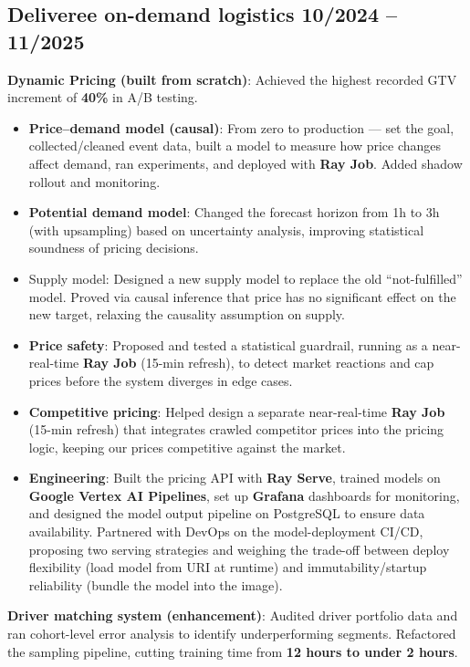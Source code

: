 \subsection{Deliveree on-demand logistics \hfill 10/2024 -- 11/2025}
\begin{zitemize}
    \item \textbf{Dynamic Pricing (built from scratch)}: Achieved the highest recorded GTV increment of \textbf{40\%} in A/B testing.
    \begin{itemize}
        \item \textbf{Price--demand model (causal)}: From zero to production --- set the goal, collected/cleaned event data, built a model to measure how price changes affect demand, ran experiments, and deployed with \textbf{Ray Job}. Added shadow rollout and monitoring.
        \item \textbf{Potential demand model}: Changed the forecast horizon from 1h to 3h (with upsampling) based on uncertainty analysis, improving statistical soundness of pricing decisions.
        \item Supply model: Designed a new supply model to replace the old ``not-fulfilled'' model. Proved via causal inference that price has no significant effect on the new target, relaxing the causality assumption on supply.
        \item \textbf{Price safety}: Proposed and tested a statistical guardrail, running as a near-real-time \textbf{Ray Job} (15-min refresh), to detect market reactions and cap prices before the system diverges in edge cases.
        \item \textbf{Competitive pricing}: Helped design a separate near-real-time \textbf{Ray Job} (15-min refresh) that integrates crawled competitor prices into the pricing logic, keeping our prices competitive against the market.
        \item \textbf{Engineering}: Built the pricing API with \textbf{Ray Serve}, trained models on \textbf{Google Vertex AI Pipelines}, set up \textbf{Grafana} dashboards for monitoring, and designed the model output pipeline on PostgreSQL to ensure data availability. Partnered with DevOps on the model-deployment CI/CD, proposing two serving strategies and weighing the trade-off between deploy flexibility (load model from URI at runtime) and immutability/startup reliability (bundle the model into the image).
    \end{itemize}
    \item \textbf{Driver matching system (enhancement)}: Audited driver portfolio data and ran cohort-level error analysis to identify underperforming segments. Refactored the sampling pipeline, cutting training time from \textbf{12 hours to under 2 hours}.
\end{zitemize}

